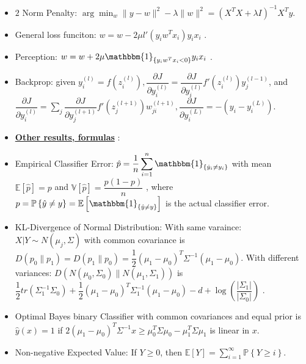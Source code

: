 \documentclass{article}
\begin{document}
\begin{itemize}
\item $2$ Norm Penalty: $\arg\displaystyle\min_{w} \|y - w \|^{2} - \lambda \| w \|^{2} = \left(X^{T} X + \lambda I\right)^{-1} X^{T} y. $
\item General loss funciton: $w  = w - 2 \mu l'\left(y_{i} w^{T} x_{i}\right) y_{i} x_{i}$ .
\item Perception: $w  = w + 2 \mu \mathbbm{1}_{\left\{y_{i} w^{T} x_{i} < 0\right\}} y_{i} x_{i}$ .
\item Backprop: given $y_{i}^{\left(l\right)} = f\left(z_{i}^{\left(l\right)}\right), \dfrac{\partial J}{\partial y_{i}^{\left(l\right)}} = \dfrac{\partial J}{\partial y_{i}^{\left(l\right)}} f'\left(z_{i}^{\left(l\right)}\right) y_{j}^{\left(l - 1\right)}$, and $\dfrac{\partial J }{\partial y_{i}^{\left(l\right)}} = \displaystyle\sum_{j} \dfrac{\partial J}{\partial y_{j}^{\left(l + 1\right)}} f'\left(z_{j}^{\left(l + 1\right)}\right) w_{ji}^{\left(l + 1\right)}, \dfrac{\partial J }{\partial y_{i}^{\left(L\right)}} = -\left(y_{i} - y_{i}^{\left(L\right)}\right)$.
\item \textbf{\underline{Other results, formulas}} :
\item Empirical Classifier Error: $\hat{p} = \dfrac{1}{n} \displaystyle\sum_{i=1}^{n} \mathbbm{1}_{\left\{\hat{y}_{i} \neq  y_{i}\right\}}$ with mean $\mathbb{E}\left[\hat{p}\right] = p $ and $\mathbb{V}\left[\hat{p}\right] = \dfrac{p \left(1 - p\right)}{n}$ , where $p  = \mathbb{P}\left\{\hat{y} \neq  y\right\} = \mathbb{E}\left[\mathbbm{1}_{\left\{\hat{y} \neq  y\right\}}\right]$ is the actual classifier error.
\item KL-Divergence of Normal Distribution: With same varaince: $X  | Y \sim  N\left(\mu_{j}, \Sigma\right)$ with common covariance is $D\left(p_{0} \| p_{1}\right)  = D\left(p_{1} \| p_{0}\right)  = \dfrac{1}{2} \left(\mu_{1} - \mu_{0}\right)^{T} \Sigma^{-1} \left(\mu_{1} - \mu_{0}\right)$. With different variances: $D\left(N\left(\mu_{0}, \Sigma_{0}\right) \| N\left(\mu_{1}, \Sigma_{1}\right)\right) $ is $\dfrac{1}{2} tr\left(\Sigma^{-1}_{1} \Sigma_{0}\right)  + \dfrac{1}{2} \left(\mu_{1} - \mu_{0}\right)^{T} \Sigma^{-1}_{1} \left(\mu_{1} - \mu_{0}\right) - d + \log\left(\dfrac{| \Sigma_{1} |}{| \Sigma_{0} |}\right)$ .
\item Optimal Bayes binary Classifier with common covariances and equal prior is $\hat{y}\left(x\right) = 1$ if $2 \left(\mu_{1} - \mu_{0}\right)^{T} \Sigma^{-1} x \geq  \mu_{0}^{T} \Sigma \mu_{0} - \mu_{1}^{T} \Sigma \mu_{1}$ is linear in $x. $
\item Non-negative Expected Value: If $Y  \geq  0$, then $\mathbb{E}\left[Y\right] = \displaystyle\sum_{i=1}^{\infty} \mathbb{P}\left\{Y \geq  i\right\}$.

\end{itemize}
\end{document}
